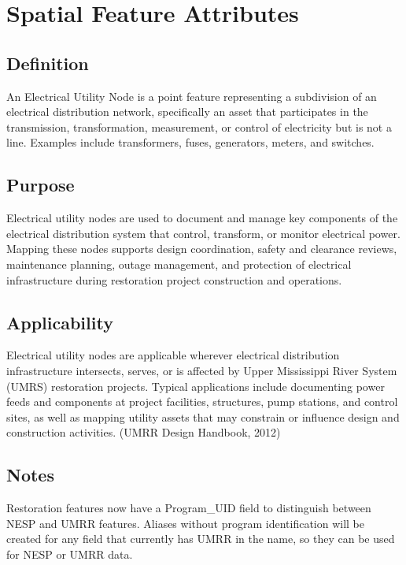 \documentclass[
  letterpaper,
  DIV=11,
  numbers=noendperiod]{scrreprt}
\begin{document}
\section{Spatial Feature Attributes}\label{spatial-feature-attributes-3}

\subsection{Definition}\label{definition-18}

An Electrical Utility Node is a point feature representing a subdivision
of an electrical distribution network, specifically an asset that
participates in the transmission, transformation, measurement, or
control of electricity but is not a line. Examples include transformers,
fuses, generators, meters, and switches.

\subsection{Purpose}\label{purpose-22}

Electrical utility nodes are used to document and manage key components
of the electrical distribution system that control, transform, or
monitor electrical power. Mapping these nodes supports design
coordination, safety and clearance reviews, maintenance planning, outage
management, and protection of electrical infrastructure during
restoration project construction and operations.

\subsection{Applicability}\label{applicability-19}

Electrical utility nodes are applicable wherever electrical distribution
infrastructure intersects, serves, or is affected by Upper Mississippi
River System (UMRS) restoration projects. Typical applications include
documenting power feeds and components at project facilities,
structures, pump stations, and control sites, as well as mapping utility
assets that may constrain or influence design and construction
activities. (UMRR Design Handbook, 2012)

\subsection{Notes}\label{notes-22}

Restoration features now have a Program\_UID field to distinguish
between NESP and UMRR features. Aliases without program identification
will be created for any field that currently has UMRR in the name, so
they can be used for NESP or UMRR data.
\end{document}
